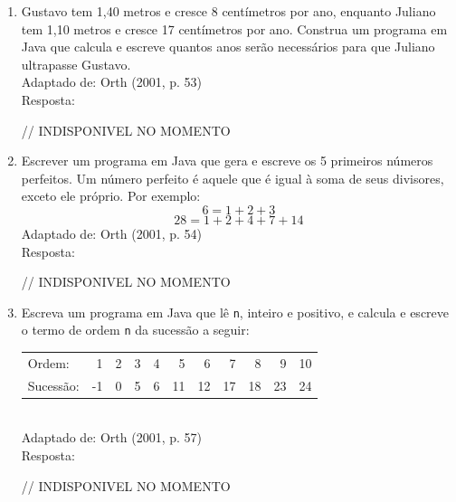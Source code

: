 \documentclass[onecolumn,a4paper,10pt]{report}
\newcommand{\+}{\, + \,}
\newcommand{\<}{\hspace*{-0.4cm}}
\begin{document}
\begin{enumerate}[1.]
\item Gustavo tem 1,40 metros e cresce 8 centímetros por ano, enquanto Juliano tem 1,10 metros e cresce 17 centímetros por ano. Construa um programa em Java que calcula e escreve quantos anos serão necessários para que Juliano ultrapasse Gustavo.\\
{\tiny Adaptado de: Orth (2001, p. 53)}\\
Resposta:\\
\begin{javacode}
// INDISPONIVEL NO MOMENTO
\end{javacode}

\item Escrever um programa em Java que gera e escreve os 5 primeiros números perfeitos. Um número perfeito é aquele que é igual à soma de seus divisores, exceto ele próprio. Por exemplo:
\[  6 = 1 + 2 + 3\]
\[ 28 = 1 + 2 + 4 + 7 + 14 \]
{\tiny Adaptado de: Orth (2001, p. 54)}\\
Resposta:\\
\begin{javacode}
// INDISPONIVEL NO MOMENTO
\end{javacode}

\item Escreva um programa em Java que lê \texttt{n}, inteiro e positivo, e calcula e escreve o termo de ordem \texttt{n} da sucessão a seguir:\\
\begin{tabular}{lrrrrrrrrrr}
Ordem: & 1 & 2 & 3 & 4 & 5 & 6 & 7 & 8 & 9 & 10\\
Sucessão: & -1 & 0 & 5 & 6 & 11 & 12 & 17 & 18 & 23 & 24\\
\end{tabular}\\
{\tiny Adaptado de: Orth (2001, p. 57)}\\
Resposta:\\
\begin{javacode}
// INDISPONIVEL NO MOMENTO
\end{javacode}


\end{enumerate}
\end{document}
